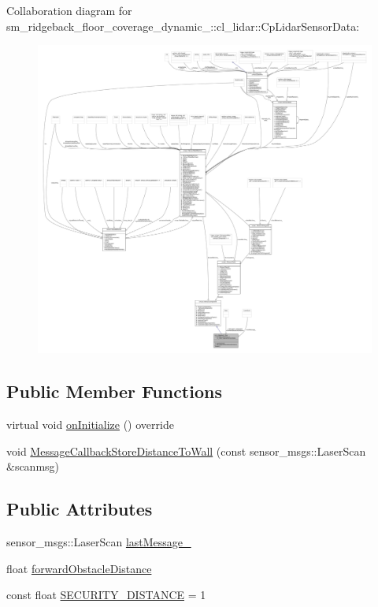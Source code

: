 Collaboration diagram for sm\+\_\+ridgeback\+\_\+floor\+\_\+coverage\+\_\+dynamic\+\_\+:\+:cl\+\_\+lidar\+:\+:Cp\+Lidar\+Sensor\+Data\+:
\nopagebreak
\begin{figure}[H]
\begin{center}
\leavevmode
\includegraphics[width=350pt]{classsm__ridgeback__floor__coverage__dynamic__1_1_1cl__lidar_1_1CpLidarSensorData__coll__graph}
\end{center}
\end{figure}
\subsection*{Public Member Functions}
\begin{DoxyCompactItemize}
\item 
virtual void \hyperlink{classsm__ridgeback__floor__coverage__dynamic__1_1_1cl__lidar_1_1CpLidarSensorData_a36e459ab99589f934a85a7106b409d9a}{on\+Initialize} () override
\item 
void \hyperlink{classsm__ridgeback__floor__coverage__dynamic__1_1_1cl__lidar_1_1CpLidarSensorData_a92a1f686f790487c60bdfd6b04b84b75}{Message\+Callback\+Store\+Distance\+To\+Wall} (const sensor\+\_\+msgs\+::\+Laser\+Scan \&scanmsg)
\end{DoxyCompactItemize}
\subsection*{Public Attributes}
\begin{DoxyCompactItemize}
\item 
sensor\+\_\+msgs\+::\+Laser\+Scan \hyperlink{classsm__ridgeback__floor__coverage__dynamic__1_1_1cl__lidar_1_1CpLidarSensorData_aaffda31c505cfda649d6b242d8b6a16b}{last\+Message\+\_\+}
\item 
float \hyperlink{classsm__ridgeback__floor__coverage__dynamic__1_1_1cl__lidar_1_1CpLidarSensorData_a28dcf895c45b7776b3c113539de4f561}{forward\+Obstacle\+Distance}
\item 
const float \hyperlink{classsm__ridgeback__floor__coverage__dynamic__1_1_1cl__lidar_1_1CpLidarSensorData_ad3d11d79183ef8e77828db7e34d8da94}{S\+E\+C\+U\+R\+I\+T\+Y\+\_\+\+D\+I\+S\+T\+A\+N\+CE} = 1
\end{DoxyCompactItemize}
